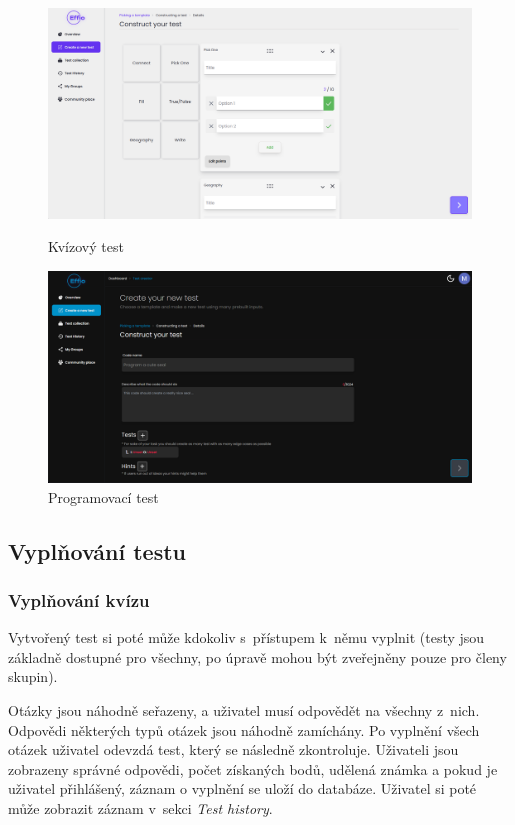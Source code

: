 \documentclass[12pt, a4paper,
openright
]{report}
\begin{document}
\begin{figure}[h]
	\centering
	\begin{minipage}[]{0.49\textwidth}
		\includegraphics[width=\textwidth]{image/test-creator1.png}
		\caption{Kvízový test}
		\label{fig:test-creator1}
	\end{minipage}
	\hfill
	\begin{minipage}[]{0.49\textwidth}
		\includegraphics[width=\textwidth]{image/test-creator2.png}
		\caption{Programovací test}
		\label{fig:test-creator2}
	\end{minipage}
\end{figure}

\subsection{Vyplňování testu}
\label{sec:test-take}
\subsubsection{Vyplňování kvízu}
Vytvořený test si poté může kdokoliv s~přístupem k~němu vyplnit (testy jsou základně dostupné pro všechny, po úpravě mohou být zveřejněny pouze pro členy skupin).

Otázky jsou náhodně seřazeny, a uživatel musí odpovědět na všechny z~nich. Odpovědi některých typů otázek jsou náhodně zamíchány. Po vyplnění všech otázek uživatel odevzdá test, který se následně zkontroluje. Uživateli jsou zobrazeny správné odpovědi, počet získaných bodů, udělená známka a pokud je uživatel přihlášený, záznam o vyplnění se uloží do databáze. Uživatel si poté může zobrazit záznam v~sekci \textit{Test history}.
\end{document}
